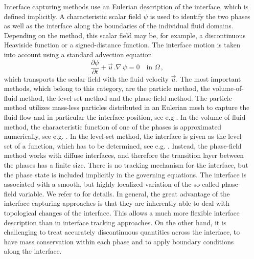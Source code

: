 Interface capturing methods use an Eulerian description of the interface, which
is defined implicitly. A characteristic scalar field $\psi$ is used to identify
the two phases as well as the interface along the boundaries of the individual
fluid domains. Depending on the method, this scalar field may be, for example,
a discontinuous Heaviside function or a signed-distance function. The interface
motion is taken into account using a standard advection equation
\begin{equation}
\frac{\partial \psi}{\partial t}+\vec u\,.\nabla\,\psi=0 \quad \mbox{in }
\Omega\,,
\end{equation}
which transports the scalar field with the fluid velocity $\vec u$. The most
important methods, which belong to this category, are the particle method,
the volume-of-fluid method, the level-set method and the phase-field method.
The particle method utilizes mass-less particles distributed in an Eulerian
mesh to capture the fluid flow and in particular the interface position, see
e.g \cite{Girault1976}. In the volume-of-fluid method, the characteristic
function of one of the phases is approximated numerically, see e.g.
\cite{HirtN81,RenardyR02,Popinet09}. In the level-set method, the interface is
given as the level set of a function, which has to be determined, see e.g.
\cite{SussmanSO94,Sethian99,OsherF03,GrossR07,Svacek17}. Instead, the
phase-field method works with diffuse interfaces, and therefore the transition
layer between the phases has a finite size. There is no tracking mechanism for
the interface, but the phase state is included implicitly in the governing
equations. The interface is associated with a smooth, but highly localized
variation of the so-called phase-field variable. We refer to
\cite{HohenbergH77,AndersonMW98,LowengrubT98,Feng06,KaySW08,AbelsGG12,GrunK14}
for details. In general, the great advantage of the interface capturing
approaches is that they are inherently able to deal with topological changes of
the interface. This allows a much more flexible interface description than in
interface tracking approaches. On the other hand, it is challenging to treat
accurately discontinuous quantities across the interface, to have mass
conservation within each phase and to apply boundary conditions along the
interface.

